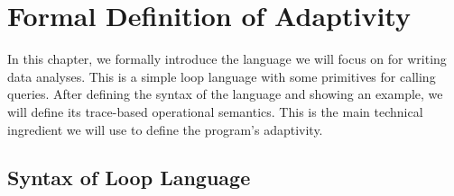 \chapter{Formal Definition of Adaptivity}
\label{ch:adapt-definition}
In this chapter, we formally introduce the language we will focus on for writing data analyses.  This is a simple loop language with some primitives for calling queries. After defining the syntax of the language and showing an example, we will define its trace-based operational semantics. This is the main technical ingredient we will use to define the program's adaptivity.

\section{Syntax of Loop Language}
\label{sec:adapt-loop-syntax}

